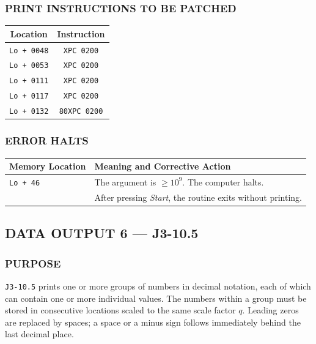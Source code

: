 \subsubsection*{PRINT INSTRUCTIONS TO BE PATCHED}
\begin{center}
\begin{tabular}{cc}
    \toprule
    \textbf{Location} & \textbf{Instruction} \\
    \midrule
    \texttt{Lo + 0048} & \texttt{XPC 0200}    \\
    \texttt{Lo + 0053} & \texttt{XPC 0200}    \\
    \texttt{Lo + 0111} & \texttt{XPC 0200}    \\
    \texttt{Lo + 0117} & \texttt{XPC 0200}    \\
    \texttt{Lo + 0132} & \texttt{80XPC 0200}  \\
    \bottomrule
\end{tabular}
\end{center}

\subsubsection*{ERROR HALTS}
\begin{center}
\begin{tabular}{ll}
    \toprule
    \textbf{Memory Location} & \textbf{Meaning and Corrective Action} \\
    \midrule
    \texttt{Lo + 46}         & The argument is $\ge 10^9$. The computer halts. \\
                             & After pressing \textit{Start}, the routine exits without printing. \\
    \bottomrule
\end{tabular}
\end{center}

\pagebreak

\subsection*{DATA OUTPUT 6 --- J3-10.5}
\label{sec:data-output-6}

\subsubsection*{PURPOSE}
\texttt{J3-10.5} prints one or more groups of numbers in decimal notation, each of which can contain one or more individual values. The numbers within a group must be stored in consecutive locations scaled to the same scale factor $q$. Leading zeros are replaced by spaces; a space or a minus sign follows immediately behind the last decimal place.

